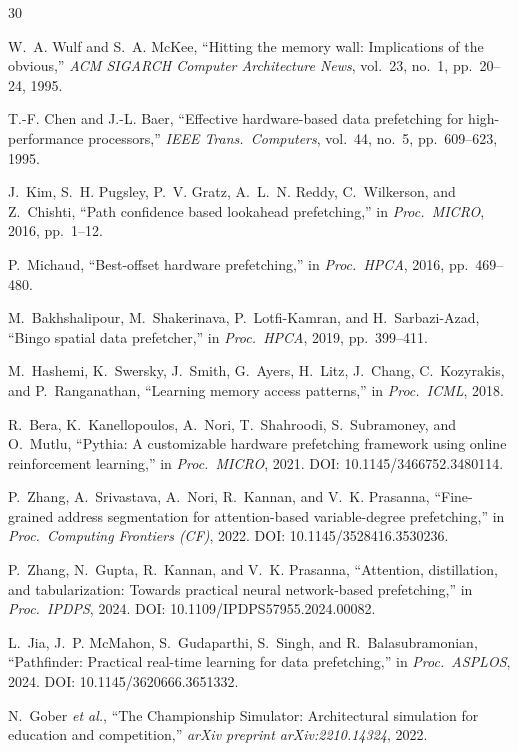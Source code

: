 \documentclass[conference]{IEEEtran}
\begin{document}
\begin{thebibliography}{30}

W.~A. Wulf and S.~A. McKee,
``Hitting the memory wall: Implications of the obvious,''
\emph{ACM SIGARCH Computer Architecture News}, vol.~23, no.~1, pp.~20--24, 1995.

T.-F. Chen and J.-L. Baer,
``Effective hardware-based data prefetching for high-performance processors,''
\emph{IEEE Trans.\ Computers}, vol.~44, no.~5, pp.~609--623, 1995.

J.~Kim, S.~H. Pugsley, P.~V. Gratz, A.~L.~N. Reddy, C.~Wilkerson, and Z.~Chishti,
``Path confidence based lookahead prefetching,''
in \emph{Proc.\ MICRO}, 2016, pp.~1--12.

P.~Michaud,
``Best-offset hardware prefetching,''
in \emph{Proc.\ HPCA}, 2016, pp.~469--480.

M.~Bakhshalipour, M.~Shakerinava, P.~Lotfi-Kamran, and H.~Sarbazi-Azad,
``Bingo spatial data prefetcher,''
in \emph{Proc.\ HPCA}, 2019, pp.~399--411.

M.~Hashemi, K.~Swersky, J.~Smith, G.~Ayers, H.~Litz, J.~Chang,
C.~Kozyrakis, and P.~Ranganathan,
``Learning memory access patterns,''
in \emph{Proc.\ ICML}, 2018.

R.~Bera, K.~Kanellopoulos, A.~Nori, T.~Shahroodi, S.~Subramoney, and O.~Mutlu,
``Pythia: A customizable hardware prefetching framework using online reinforcement learning,''
in \emph{Proc.\ MICRO}, 2021.
\newblock DOI: 10.1145/3466752.3480114.

P.~Zhang, A.~Srivastava, A.~Nori, R.~Kannan, and V.~K. Prasanna,
``Fine-grained address segmentation for attention-based variable-degree prefetching,''
in \emph{Proc.\ Computing Frontiers (CF)}, 2022.
\newblock DOI: 10.1145/3528416.3530236.

P.~Zhang, N.~Gupta, R.~Kannan, and V.~K. Prasanna,
``Attention, distillation, and tabularization: Towards practical neural
network-based prefetching,''
in \emph{Proc.\ IPDPS}, 2024.
\newblock DOI: 10.1109/IPDPS57955.2024.00082.

L.~Jia, J.~P. McMahon, S.~Gudaparthi, S.~Singh, and R.~Balasubramonian,
``{Pathfinder}: Practical real-time learning for data prefetching,''
in \emph{Proc.\ ASPLOS}, 2024.
\newblock DOI: 10.1145/3620666.3651332.

N.~Gober \emph{et al.},
``The Championship Simulator: Architectural simulation for education and competition,''
\emph{arXiv preprint arXiv:2210.14324}, 2022.


\end{thebibliography}
\end{document}
